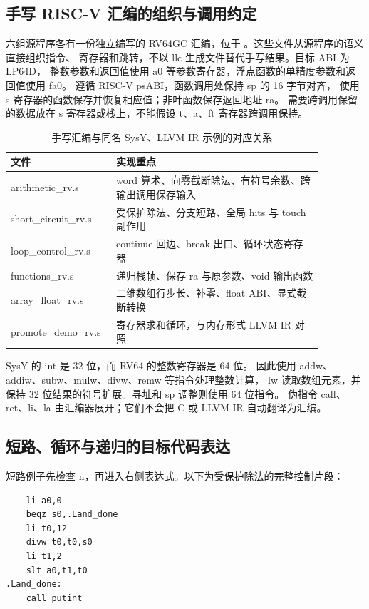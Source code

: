 \documentclass[UTF8,a4paper,11pt]{ctexart}
\begin{document}
\subsection{手写 RISC-V 汇编的组织与调用约定}
六组源程序各有一份独立编写的 RV64GC 汇编，位于
。这些文件从源程序的语义直接组织指令、
寄存器和跳转，不以 llc 生成文件替代手写结果。目标 ABI 为 LP64D，
整数参数和返回值使用 a0 等参数寄存器，浮点函数的单精度参数和返回值使用 fa0。
遵循 RISC-V psABI\cite{riscvabi}，函数调用处保持 sp 的 16 字节对齐，
使用 s 寄存器的函数保存并恢复相应值；非叶函数保存返回地址 ra。
需要跨调用保留的数据放在 s 寄存器或栈上，不能假设 t、a、ft 寄存器跨调用保持。

\begin{table}[htbp]
\centering\small
\begin{tabular}{p{0.25\linewidth}p{0.62\linewidth}}
\toprule
文件 & 实现重点\\
\midrule
arithmetic\_rv.s & word 算术、向零截断除法、有符号余数、跨输出调用保存输入\\
short\_circuit\_rv.s & 受保护除法、分支短路、全局 hits 与 touch 副作用\\
loop\_control\_rv.s & continue 回边、break 出口、循环状态寄存器\\
functions\_rv.s & 递归栈帧、保存 ra 与原参数、void 输出函数\\
array\_float\_rv.s & 二维数组行步长、补零、float ABI、显式截断转换\\
promote\_demo\_rv.s & 寄存器求和循环，与内存形式 LLVM IR 对照\\
\bottomrule
\end{tabular}
\caption{手写汇编与同名 SysY、LLVM IR 示例的对应关系}
\end{table}

SysY 的 int 是 32 位，而 RV64 的整数寄存器是 64 位。
因此使用 addw、addiw、subw、mulw、divw、remw 等指令处理整数计算，
lw 读取数组元素，并保持 32 位结果的符号扩展。寻址和 sp 调整则使用 64 位指令。
伪指令 call、ret、li、la 由汇编器展开；它们不会把 C 或 LLVM IR 自动翻译为汇编。

\subsection{短路、循环与递归的目标代码表达}
短路例子先检查 n，再进入右侧表达式。以下为受保护除法的完整控制片段：

\par\vspace{0.7\baselineskip}\noindent\begin{minipage}[t]{\linewidth}
\begin{lstlisting}
    li a0,0
    beqz s0,.Land_done
    li t0,12
    divw t0,t0,s0
    li t1,2
    slt a0,t1,t0
.Land_done:
    call putint
\end{lstlisting}
\end{minipage}\par\vspace{0.5\baselineskip}
\end{document}
